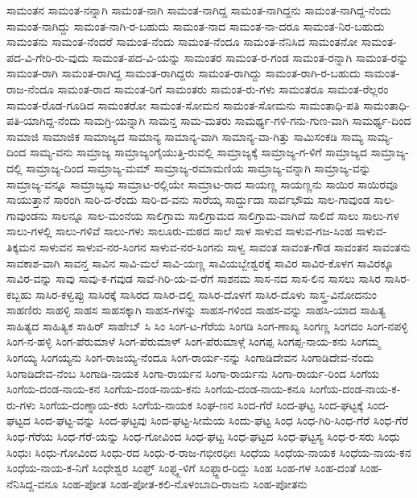 {ಸಾಮಂತನ
ಸಾಮಂತ-ನನ್ನಾಗಿ
ಸಾಮಂತ-ನಾಗಿ
ಸಾಮಂತ-ನಾಗಿದ್ದ
ಸಾಮಂತ-ನಾಗಿದ್ದನು
ಸಾಮಂತ-ನಾಗಿದ್ದ-ನೆಂದು
ಸಾಮಂತ-ನಾಗಿದ್ದು
ಸಾಮಂತ-ನಾಗಿ-ರ-ಬಹುದು
ಸಾಮಂತ-ನಾದ
ಸಾಮಂತ-ನಾ-ದರೂ
ಸಾಮಂತ-ನಿರ-ಬಹುದು
ಸಾಮಂತನು
ಸಾಮಂತ-ನೆಂದರೆ
ಸಾಮಂತ-ನೆಂದು
ಸಾಮಂತ-ನೆಂದೂ
ಸಾಮಂತ-ನೆನಿಸಿದ
ಸಾಮಂತನೋ
ಸಾಮಂತ-ಪದ-ವಿ-ಗೇರಿ-ರು-ವುದು
ಸಾಮಂತ-ಪದ-ವಿ-ಯನ್ನು
ಸಾಮಂತರ
ಸಾಮಂತ-ರ-ಗಂಡ
ಸಾಮಂತ-ರನ್ನಾಗಿ
ಸಾಮಂತ-ರನ್ನು
ಸಾಮಂತ-ರಾಗಿ
ಸಾಮಂತ-ರಾಗಿದ್ದ
ಸಾಮಂತ-ರಾಗಿದ್ದರು
ಸಾಮಂತ-ರಾಗಿದ್ದು
ಸಾಮಂತ-ರಾಗಿ-ರ-ಬಹುದು
ಸಾಮಂತ-ರಾಜ-ನೆಂದೂ
ಸಾಮಂತ-ರಾದ
ಸಾಮಂತ-ರಿಗೆ
ಸಾಮಂತರು
ಸಾಮಂತ-ರು-ಗಳು
ಸಾಮಂತರೂ
ಸಾಮಂತ-ರೆಲ್ಲರಂ
ಸಾಮಂತ-ರೊಡ-ಗೂಡಿದ
ಸಾಮಂತರೋ
ಸಾಮಂತ-ಸೋಮನ
ಸಾಮಂತ-ಸೋಮನು
ಸಾಮಂತಾಧಿ-ಪತಿ
ಸಾಮಂತಾಧಿ-ಪತಿ-ಯಾಗಿದ್ದ-ನೆಂದು
ಸಾಮಗ್ರಿ-ಯನ್ನಾಗಿ
ಸಾಮನ್ತ
ಸಾಮ-ಮತರು
ಸಾಮರ್ಥ್ಯ-ಗಳಿ-ಗನು-ಗುಣ-ವಾಗಿ
ಸಾಮರ್ಥ್ಯ-ದಿಂದ
ಸಾಮಾಜಿ
ಸಾಮಾಜಿಕ
ಸಾಮಾಜ್ಯದ
ಸಾಮಾನ್ಯ
ಸಾಮಾನ್ಯ-ವಾಗಿ
ಸಾಮಾನ್ಯ-ವಾ-ಗಿತ್ತು
ಸಾಮಿಸಂಕಡಿ
ಸಾಮ್ಯ
ಸಾಮ್ಯ-ದಿಂದ
ಸಾಮ್ಯ-ವನು
ಸಾಮ್ರಾಜ್ಯ
ಸಾಮ್ರಾಜ್ಯಂಗೈಯುತ್ತಿ-ರುವಲ್ಲಿ
ಸಾಮ್ರಾಜ್ಯಕ್ಕೆ
ಸಾಮ್ರಾಜ್ಯ-ಗ-ಳಿಗೆ
ಸಾಮ್ರಾಜ್ಯದ
ಸಾಮ್ರಾಜ್ಯ-ದಲ್ಲಿ
ಸಾಮ್ರಾಜ್ಯ-ದಿಂದ
ಸಾಮ್ರಾಜ್ಯ-ಮಮ್
ಸಾಮ್ರಾಜ್ಯ-ರಮಾಮಣಿಯ
ಸಾಮ್ರಾಜ್ಯ-ವನ್ನಾಗಿ
ಸಾಮ್ರಾಜ್ಯ-ವನ್ನು
ಸಾಮ್ರಾಜ್ಯ-ವನ್ನೂ
ಸಾಮ್ರಾಜ್ಯವು
ಸಾಮ್ರಾಟ-ರಲ್ಲಿಯೇ
ಸಾಮ್ರಾಟ-ರಾದ
ಸಾಯಣ್ಣ
ಸಾಯಣ್ಣನು
ಸಾಯಿರ
ಸಾಯಿರವೂ
ಸಾಯುತ್ತಾನೆ
ಸಾರಂಗಿ
ಸಾರಿ-ದ-ರೆಂದು
ಸಾರಿ-ದ-ವನು
ಸಾರೆಯ್ಕ
ಸಾರ್ದ್ದುದಾ
ಸಾರ್ವಭೌಮ
ಸಾಲ-ಗಾವುಂಡ
ಸಾಲ-ಗಾವುಂಡನು
ಸಾಲನ್ನೂ
ಸಾಲ-ಮಂನೆಯ
ಸಾಲಿಗ್ರಾಮ
ಸಾಲಿಗ್ರಾಮದ
ಸಾಲಿಗ್ರಾಮ-ವಾಗಿದೆ
ಸಾಲಿದೆ
ಸಾಲು
ಸಾಲು-ಗಳ
ಸಾಲು-ಗಳಲ್ಲಿ
ಸಾಲು-ಗಳಿವೆ
ಸಾಲು-ಗಳು
ಸಾಲೂರು-ಮಠದ
ಸಾಲೆ
ಸಾಳ
ಸಾಳುವ
ಸಾಳುವ-ಗಜ-ಸಿಂಹ
ಸಾಳುವ-ತಿಕ್ಕಮನ
ಸಾಳುವನ
ಸಾಳುವ-ನರ-ಸಿಂಗನ
ಸಾಳುವ-ನರ-ಸಿಂಗನು
ಸಾಳ್ವ
ಸಾವಂತ
ಸಾವಂತ-ಗೌಡ
ಸಾವಂತನ
ಸಾವಂತನು
ಸಾವಕಾಶ-ವಾಗಿ
ಸಾವನ್ತ
ಸಾವಿನ
ಸಾವಿ-ಮಲೆ
ಸಾವಿ-ಯಣ್ಣ
ಸಾವಿಯಬ್ಬೇಶ್ವರಕ್ಕೆ
ಸಾವಿರ
ಸಾವಿರ-ಕೊಳಗ
ಸಾವಿರಕ್ಕೂ
ಸಾವಿರ-ವನ್ನು
ಸಾವು
ಸಾವು-ಕ-ಗವುಡ
ಸಾವೆ-ಗಿರಿ-ಯ-ವ-ರೆಗೆ
ಸಾಶನಮ
ಸಾಸ-ನದ
ಸಾಸ-ಲಿನ
ಸಾಸಲು
ಸಾಸಿರ
ಸಾಸಿರ-ಕಬ್ಬಹು
ಸಾಸಿರ-ಕಳ್ವಪ್ಪು
ಸಾಸಿರಕ್ಕೆ
ಸಾಸಿರದ
ಸಾಸಿರ-ದಲ್ಲಿ
ಸಾಸಿರ-ದೊಳಗೆ
ಸಾಸಿರ-ದೊಳು
ಸಾಸ್ತ್ರ-ವಿನೋದನುಂ
ಸಾಹಣಿರು
ಸಾಹಳ್ಳಿ
ಸಾಹಸ
ಸಾಹಸಕ್ಕಾಗಿ
ಸಾಹಸ-ಗಳನ್ನು
ಸಾಹಸ-ಗಳಿಂದ
ಸಾಹಸ-ವನ್ನು
ಸಾಹಸಿ-ಯಾದ
ಸಾಹಿತ್ಯ
ಸಾಹಿತ್ಯದ
ಸಾಹಿತ್ಯಿಕ
ಸಾಹಿರ್
ಸಾಹೇಬ್
ಸಿ
ಸಿಂ
ಸಿಂಗ-ಟ-ಗೆರೆಯ
ಸಿಂಗಡಿ
ಸಿಂಗ-ಣಾಖ್ಯ
ಸಿಂಗಣ್ಣ
ಸಿಂಗದಂ
ಸಿಂಗ-ನಪಳ್ಳಿ
ಸಿಂಗ-ನ-ಹಳ್ಳಿ
ಸಿಂಗ-ಪೆರುಮಾಳೆ
ಸಿಂಗ-ಪೆರುಮಾಳ್
ಸಿಂಗ-ಪೆರುಮಾಳ್ಗೆ
ಸಿಂಗಪ್ಪ
ಸಿಂಗಪ್ಪ-ನಾಯ-ಕನು
ಸಿಂಗಮ್ಮ
ಸಿಂಗಯ್ಯ
ಸಿಂಗಯ್ಯನು
ಸಿಂಗ-ರಾಜಯ್ಯ-ನೆಂದೂ
ಸಿಂಗ-ರಾರ್ಯ-ನನ್ನು
ಸಿಂಗಾಡಿದೇವನ
ಸಿಂಗಾಡಿದೇವ-ನೆಂದು
ಸಿಂಗಾಡಿದೇವ-ನೆಂಬ
ಸಿಂಗಾಡಿ-ನಾಯಕ
ಸಿಂಗಾ-ರಾರ್ಯನ
ಸಿಂಗಾ-ರಾರ್ಯನು
ಸಿಂಗಾ-ರಾರ್ಯ-ರಿಂದ
ಸಿಂಗೆಯ
ಸಿಂಗೆಯ-ದಂಡ-ನಾಯ-ಕನ
ಸಿಂಗೆಯ-ದಂಡ-ನಾಯ-ಕನು
ಸಿಂಗೆಯ-ದಂಡ-ನಾಯ-ಕನೂ
ಸಿಂಗೆಯ-ದಂಡ-ನಾಯ-ಕ-ರು-ಗಳು
ಸಿಂಗೆಯ-ದಂಣ್ನಾಯ-ಕರು
ಸಿಂಗೆಯ-ನಾಯಕ
ಸಿಂಘ-ಣನ
ಸಿಂದ-ಗೆರೆ
ಸಿಂದ-ಘಟ್ಟ
ಸಿಂದ-ಘಟ್ಟಕ್ಕೆ
ಸಿಂದ-ಘಟ್ಟದ
ಸಿಂದ-ಘಟ್ಟ-ವನ್ನು
ಸಿಂದ-ಘಟ್ಟವು
ಸಿಂದ-ಘಟ್ಟ-ಸೀಮೆಯ
ಸಿಂದು-ಘಟ್ಟ
ಸಿಂಧ
ಸಿಂಧ-ಗಿರಿ-ಸಿಂಧ-ಗೆರೆ
ಸಿಂಧ-ಗೆರೆ
ಸಿಂಧ-ಗೆರೆಯ
ಸಿಂಧ-ಗೆರೆ-ಯನ್ನು
ಸಿಂಧ-ಗೋವಿಂದ
ಸಿಂಧ-ಘಟ್ಟ
ಸಿಂಧ-ಘಟ್ಟದ
ಸಿಂಧ-ಘಟ್ಟಸ್ಯ
ಸಿಂಧ-ರ-ಸರು
ಸಿಂಧು
ಸಿಂಧುಃ
ಸಿಂಧು-ಗೋವಿಂದ
ಸಿಂಧು-ರದ
ಸಿಂಧು-ರ-ರಾಜ-ಗಭೀರಧೀಃ
ಸಿಂಧೆಯ
ಸಿಂಧೆಯ-ನಾಯಕ
ಸಿಂಧೆಯ-ನಾಯ-ಕನ
ಸಿಂಧೆಯ-ನಾಯ-ಕ-ನಿಗೆ
ಸಿಂಧೇಶ್ವರ
ಸಿಂಫ್ತ್
ಸಿಂಫ್ತ್ಗ-ಳಿಗೆ
ಸಿಂಫ್ತ್ದಾರ-ರಿದ್ದು
ಸಿಂಹ
ಸಿಂಹ-ಗಳ
ಸಿಂಹ-ದಂತೆ
ಸಿಂಹ-ನೆನಿಸಿದ್ದ-ವನೂ
ಸಿಂಹ-ಪೋತ
ಸಿಂಹ-ಪೋತ-ಕಲಿ-ನೊಳಂಬಾದಿ-ರಾಜನು
ಸಿಂಹ-ಪೋತನು
}
